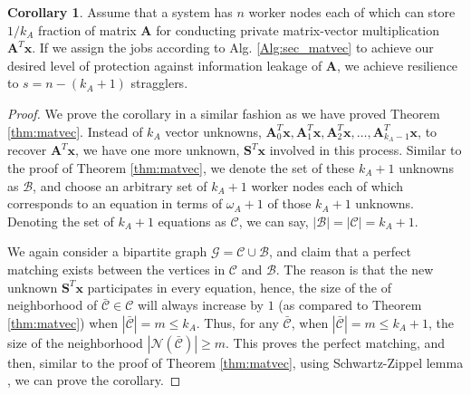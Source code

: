 \documentclass[conference]{IEEEtran}
\theoremstyle{definition}
\newtheorem{corollary}{Corollary}
\newcommand{\calB}{\mathcal{B}}
\newcommand{\calC}{\mathcal{C}}
\newcommand{\calG}{\mathcal{G}}
\newcommand{\calN}{\mathcal{N}}
\newcommand{\bfA}{\mathbf{A}}
\newcommand{\bfS}{\mathbf{S}}
\newcommand{\bfx}{\mathbf{x}}
\begin{document}
\begin{corollary}
\label{cor:private}
Assume that a system has $n$ worker nodes each of which can store $1/k_A$ fraction of matrix $\bfA$ for conducting private matrix-vector multiplication $\mathbf{A}^T \bfx$. If we assign the jobs according to Alg. \ref{Alg:sec_matvec} to achieve our desired level of protection against information leakage of $\bfA$, we achieve resilience to $s = n - (k_A+1)$ stragglers.    
\end{corollary}

\begin{proof}
We prove the corollary in a similar fashion as we have proved Theorem \ref{thm:matvec}. Instead of $k_A$ vector unknowns, $\bfA^T_0 \bfx, \bfA^T_1 \bfx, \bfA^T_2 \bfx, \dots, \bfA^T_{k_A - 1} \bfx$, to recover $\bfA^T \bfx$, we have one more unknown, $\bfS^T \bfx$ involved in this process. Similar to the proof of Theorem \ref{thm:matvec}, we denote the set of these $k_A+1$ unknowns as $\calB$, and choose an arbitrary set of $k_A+1$ worker nodes each of which corresponds to an equation in terms of $\omega_A+1$ of those $k_A+1$ unknowns. Denoting the set of $k_A+1$ equations as $\calC$, we can say,  $|\calB| = |\calC| = k_A+1$. 

We again consider a bipartite graph $\calG = \calC \cup \calB$, and claim that a perfect matching exists between the vertices in $\calC$ and $\calB$. The reason is that the new unknown $\bfS^T \bfx$ participates in every equation, hence, the size of the of neighborhood of $\bar{\calC} \in \calC$ will always increase by $1$ (as compared to Theorem \ref{thm:matvec}) when $|\bar{\calC}| = m \leq k_A$. Thus, for any $\bar{\calC}$, when $|\bar{\calC}| = m \leq k_A + 1$, the size of the neighborhood $|\calN(\bar{\calC})| \geq m$. This proves the perfect matching, and then, similar to the proof of Theorem \ref{thm:matvec}, using Schwartz-Zippel lemma \cite{schwartz1980fast}, we can prove the corollary.
\end{proof}
\end{document}
